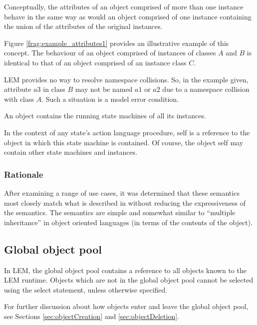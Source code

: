 Conceptually, the attributes of an object comprised of more than one
instance behave in the same way as would an object comprised of one
instance containing the union of the attributes of the original instances.


Figure \ref{frag:example_attributes1} provides an illustrative example of this
concept.  The behaviour of an object comprised of instances of classes $A$ and
$B$ is identical to that of an object comprised of an instance class $C$.

LEM provides no way to resolve namespace collisions. So, in the example given,
attribute $a3$ in class $B$ may not be named $a1$ or $a2$ due to a namespace
collision with class $A$. Such a situation is a model error condition. 

An object contains the running state machines of all its instances.

In the context of any state's action language procedure, \textsf{self} is a
reference to the object in which this state machine is contained. Of course,
the object \textsf{self} may contain other state machines and instances.


\subsubsection{Rationale}
After examining a range of use cases, it was determined that these semantics
most closely match what is described in \cite{mellor:2002} without reducing
the expressiveness of the semantics. The semantics are simple and somewhat
similar to ``multiple inheritance'' in object oriented languages (in terms of
the contents of the object).

\subsection{Global object pool}
In LEM, the \textsf{global object pool} contains a reference to all objects
known to the LEM runtime. Objects which are not in the global object pool
cannot be selected using the \textsf{select} statement, unless otherwise
specified.

For further discussion about how objects enter and leave the global object pool,
see Sections \ref{sec:objectCreation} and \ref{sec:objectDeletion}.

